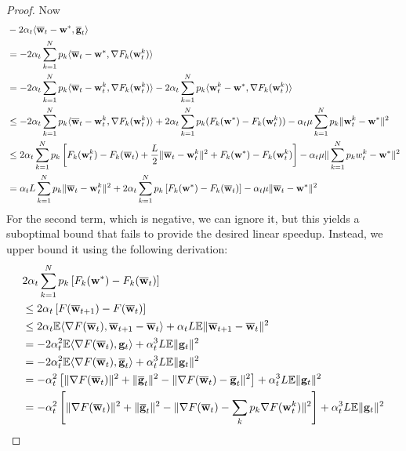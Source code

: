 \begin{proof}
	Now 
	\begin{align*}
	& -2\alpha_{t}\langle{\overline{\mathbf{w}}}_{t}-{\mathbf{w}}^{\ast},{\overline{\mathbf{g}}}_{t}\rangle\\
	& =-2\alpha_{t}\sum_{k=1}^{N}p_{k}\langle{\overline{\mathbf{w}}}_{t}-{\mathbf{w}}^{\ast},\nabla F_{k}({\mathbf{w}}_{t}^{k})\rangle\\
	& =-2\alpha_{t}\sum_{k=1}^{N}p_{k}\langle{\overline{\mathbf{w}}}_{t}-{\mathbf{w}}_{t}^{k},\nabla F_{k}({\mathbf{w}}_{t}^{k})\rangle-2\alpha_{t}\sum_{k=1}^{N}p_{k}\langle {\mathbf{w}}_{t}^{k}-{\mathbf{w}}^{\ast},\nabla F_{k}({\mathbf{w}}_{t}^{k})\rangle\\
	& \leq-2\alpha_{t}\sum_{k=1}^{N}p_{k}\langle{\overline{\mathbf{w}}}_{t}-{\mathbf{w}}_{t}^{k},\nabla F_{k}({\mathbf{w}}_{t}^{k})\rangle+2\alpha_{t}\sum_{k=1}^{N}p_{k}(F_{k}({\mathbf{w}}^{\ast})-F_{k}({\mathbf{w}}_{t}^{k}))-\alpha_{t}\mu\sum_{k=1}^{N}p_{k}\|{\mathbf{w}}_{t}^{k}-{\mathbf{w}}^{\ast}\|^{2}\\
	& \leq2\alpha_{t}\sum_{k=1}^{N}p_{k}\left[F_{k}({\mathbf{w}}_{t}^{k})-F_{k}({\overline{\mathbf{w}}}_{t})+\frac{L}{2}\|{\overline{\mathbf{w}}}_{t}-{\mathbf{w}}_{t}^{k}\|^{2}+F_{k}({\mathbf{w}}^{\ast})-F_{k}({\mathbf{w}}_{t}^{k})\right]-\alpha_{t}\mu\|\sum_{k=1}^{N}p_{k}w_{t}^{k}-{\mathbf{w}}^{\ast}\|^{2}\\
	& =\alpha_{t}L\sum_{k=1}^{N}p_{k}\|{\overline{\mathbf{w}}}_{t}-{\mathbf{w}}_{t}^{k}\|^{2}+2\alpha_{t}\sum_{k=1}^{N}p_{k}\left[F_{k}({\mathbf{w}}^{\ast})-F_{k}({\overline{\mathbf{w}}}_{t})\right]-\alpha_{t}\mu\|{\overline{\mathbf{w}}}_{t}-{\mathbf{w}}^{\ast}\|^{2}
	\end{align*}
	For the second term, which is negative, we can ignore it, but this
	yields a suboptimal bound that fails to provide the desired linear
	speedup. Instead, we upper bound it using the following derivation:
	\begin{align*}
	& 2\alpha_{t}\sum_{k=1}^{N}p_{k}\left[F_{k}(\vw^{\ast})-F_{k}(\ov{w}_{t})\right]\\
	& \leq2\alpha_{t}\left[F(\ov{w}_{t+1})-F(\ov{w}_{t})\right]\\
	& \leq2\alpha_{t}\mathbb{E}\langle\nabla F(\ov{w}_{t}),\ov{w}_{t+1}-\ov{w}_{t}\rangle+\alpha_{t}L\mathbb{E}\|\ov{w}_{t+1}-\ov{w}_{t}\|^{2}\\
	& =-2\alpha_{t}^{2}\mathbb{E}\langle\nabla F(\ov{w}_{t}),\vg_{t}\rangle+\alpha_{t}^{3}L\mathbb{E}\|\vg_{t}\|^{2}\\
	& =-2\alpha_{t}^{2}\mathbb{E}\langle\nabla F(\ov{w}_{t}),\ov{g}_{t}\rangle+\alpha_{t}^{3}L\mathbb{E}\|\vg_{t}\|^{2}\\
	& =-\alpha_{t}^{2}\left[\|\nabla F(\ov{w}_{t})\|^{2}+\|\ov{g}_{t}\|^{2}-\|\nabla F(\ov{w}_{t})-\ov{g}_{t}\|^{2}\right]+\alpha_{t}^{3}L\mathbb{E}\|\vg_{t}\|^{2}\\
	& =-\alpha_{t}^{2}\left[\|\nabla F(\ov{w}_{t})\|^{2}+\|\ov{g}_{t}\|^{2}-\|\nabla F(\ov{w}_{t})-\sum_{k}p_{k}\nabla F(\vw_{t}^{k})\|^{2}\right]+\alpha_{t}^{3}L\mathbb{E}\|\vg_{t}\|^{2}\\

\end{align*}
\end{proof}

